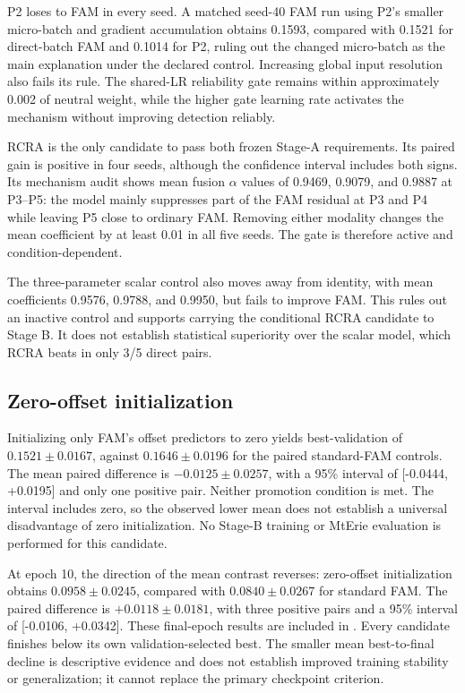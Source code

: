 P2 loses to FAM in every seed. A matched seed-40 FAM run using P2's smaller
micro-batch and gradient accumulation obtains 0.1593, compared with 0.1521 for
direct-batch FAM and 0.1014 for P2, ruling out the changed micro-batch as the
main explanation under the declared control. Increasing global input
resolution also fails its rule. The shared-LR reliability gate remains within
approximately 0.002 of neutral weight, while the higher gate learning rate
activates the mechanism without improving detection reliably.

RCRA is the only candidate to pass both frozen Stage-A requirements. Its paired
gain is positive in four seeds, although the confidence interval includes both
signs. Its mechanism audit shows mean fusion \(\alpha\) values of 0.9469,
0.9079, and 0.9887 at P3--P5: the model mainly suppresses part of the FAM
residual at P3 and P4 while leaving P5 close to ordinary FAM. Removing either
modality changes the mean coefficient by at least 0.01 in all five seeds. The
gate is therefore active and condition-dependent.

The three-parameter scalar control also moves away from identity, with mean
coefficients 0.9576, 0.9788, and 0.9950, but fails to improve FAM. This rules
out an inactive control and supports carrying the conditional RCRA candidate
to Stage B. It does not establish statistical superiority over the scalar
model, which RCRA beats in only 3/5 direct pairs.

\subsection{Zero-offset initialization}
\label{sec:zero-offset-results}

Initializing only FAM's offset predictors to zero yields best-validation
\mapfifty{} of \(0.1521\pm0.0167\), against \(0.1646\pm0.0196\) for the
paired standard-FAM controls. The mean paired difference is
\(-0.0125\pm0.0257\), with a 95\% interval of [-0.0444, +0.0195] and only
one positive pair. Neither promotion condition is met. The interval includes
zero, so the observed lower mean does not establish a universal disadvantage
of zero initialization. No Stage-B training or MtErie evaluation is performed
for this candidate.

At epoch 10, the direction of the mean contrast reverses: zero-offset
initialization obtains \(0.0958\pm0.0245\), compared with
\(0.0840\pm0.0267\) for standard FAM. The paired difference is
\(+0.0118\pm0.0181\), with three positive pairs and a 95\% interval of
[-0.0106, +0.0342]. These final-epoch results are included in
. Every candidate finishes below its own
validation-selected best. The smaller mean best-to-final decline is
descriptive evidence and does not establish improved training stability or
generalization; it cannot replace the primary checkpoint criterion.

